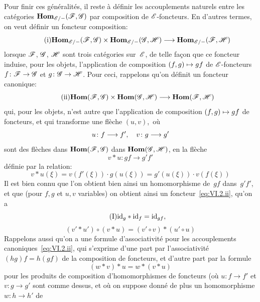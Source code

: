 Pour finir ces g\'en\'eralit\'es, il reste \`a d\'efinir les
accouplements naturels entre les cat\'egories
$\SheafHom_{\cal{E}/-}(\cal{F},\cal{G})$ par composition de
$\cal{E}$-foncteurs. En d'autres termes, on veut d\'efinir un
\og foncteur composition\fg:
\begin{equation*}
\label{eq:VI.2.i}
\tag{i} {\SheafHom_{\cal{E}/-}(\cal{F},\cal{G})\times
\SheafHom_{\cal{E}/-}(\cal{G},\cal{H})\to
\SheafHom_{\cal{E}/-}(\cal{F},\cal{H})}
\end{equation*}
lorsque $\cal{F}$, $\cal{G}$, $\cal{H}$ sont trois cat\'egories
sur~$\cal{E}$, de telle fa\c con que ce foncteur induise, pour les
objets, l'application de composition $(f,g)\mto gf$ de
$\cal{E}$-foncteurs $f\colon\cal{F}\to\cal{G}$ et $g\colon \cal{G}\to
\cal{H}$. Pour ceci, rappelons qu'on d\'efinit un foncteur
canonique:
\begin{equation*}
\label{eq:VI.2.ii}
\tag{ii}
{\SheafHom(\cal{F},\cal{G})\times\SheafHom(\cal{G},\cal{H})\to
\SheafHom(\cal{F},\cal{H})}
\end{equation*}
qui, pour les objets, n'est autre que l'application de composition
$(f,g)\mto gf$ de foncteurs, et qui transforme une fl\`eche
$(u,v)$,~o\`u
$$
u\colon f\to f'\quoi,\quad v\colon g\to g'
$$
sont des fl\`eches dans $\SheafHom(\cal{F},\cal{G})$ \resp dans
$\SheafHom(\cal{G},\cal{H})$, en la fl\`eche
$$
v*u\colon gf\to g'f'
$$
\label{indnot:fj}d\'efinie par la relation:
$$
v*u(\xi)=v(f'(\xi))\cdot g(u(\xi))=g'(u(\xi))\cdot v(f(\xi))
$$
Il est bien connu que l'on obtient bien ainsi un homomorphisme de~$gf$
dans~$g'f'$, et que (pour $f,g$ et $u,v$ variables) on obtient ainsi
un foncteur~\eqref{eq:VI.2.ii}, \ie qu'on a
\begin{equation*}
\label{eq:VI.2.I}
\tag{I} {\mathrm{id}_g*\mathrm{id}_f=\mathrm{id}_{gf},}
\end{equation*}
\begin{equation*}
\label{eq:VI.2.II}
\tag{II} {(v'*u')\circ(v*u)=(v'\circ v)*(u'\circ u)}
\end{equation*}
Rappelons aussi qu'on a une formule d'associativit\'e pour les
accouplements canoniques~\eqref{eq:VI.2.ii}, qui s'exprime d'une part
par l'associativit\'e $(hg)f=h(gf)$ de la composition de foncteurs,
et d'autre part par la formule
\begin{equation*}
\label{eq:VI.2.III}
\tag{III} {(w*v)*u=w*(v*u)}
\end{equation*}
pour les produits de composition d'homomorphismes de foncteurs (o\`u
$u\colon f\to f'$ et $v\colon g\to g'$ sont comme dessus, et o\`u on
suppose donn\'e de plus un homomorphisme $w\colon h\to h'$ de
